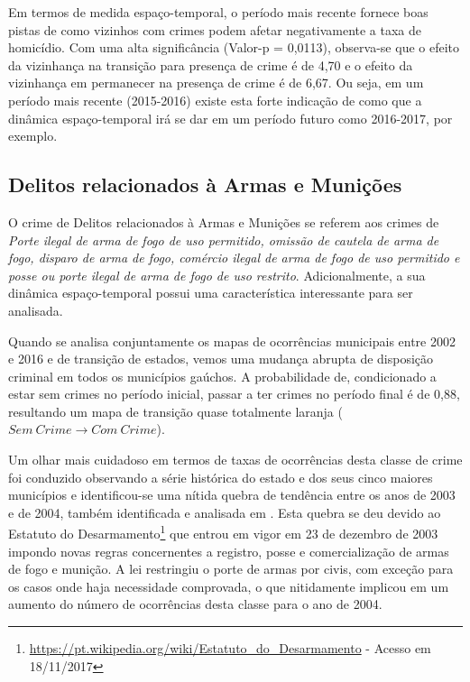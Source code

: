 \documentclass[12pt,openright,oneside,a4paper,english,french,spanish]{abntex2}
\numberwithin{table}{section} %
\numberwithin{figure}{section} %
\newcommand{\co}{\citeonline}
\begin{document}
Em termos de medida espaço-temporal, o período mais recente fornece boas pistas de como vizinhos com crimes podem afetar negativamente a taxa de homicídio. Com uma alta significância (Valor-p = 0,0113), observa-se que o efeito da vizinhança na transição para presença de crime é de 4,70 e o efeito da vizinhança em permanecer na presença de crime é de 6,67. Ou seja, em um período mais recente (2015-2016) existe esta forte indicação de como que a dinâmica espaço-temporal irá se dar em um período futuro como 2016-2017, por exemplo.

\subsection{Delitos relacionados à Armas e Munições\label{sec:armas_acoplamento}}

O crime de Delitos relacionados à Armas e Munições se referem aos crimes de \textit{Porte ilegal de arma de fogo de uso permitido, omissão de cautela de arma de fogo, disparo de arma de fogo, comércio ilegal de arma de fogo de uso permitido e posse ou porte ilegal de arma de fogo de uso restrito}. Adicionalmente, a sua dinâmica espaço-temporal possui uma característica interessante para ser analisada.

Quando se analisa conjuntamente os mapas de ocorrências municipais entre 2002 e 2016 e de transição de estados, vemos uma mudança abrupta de disposição criminal em todos os municípios gaúchos. A probabilidade de, condicionado a estar sem crimes no período inicial, passar a ter crimes no período final é de 0,88, resultando um mapa de transição quase totalmente laranja ($Sem \ Crime \rightarrow Com \ Crime$).

Um olhar mais cuidadoso em termos de taxas de ocorrências desta classe de crime foi conduzido observando a série histórica do estado e dos seus cinco maiores municípios e identificou-se uma nítida quebra de tendência entre os anos de 2003 e de 2004, também identificada e analisada em \co{menezes2017relaccoes}. Esta quebra se deu devido ao Estatuto do Desarmamento\footnote{\url{https://pt.wikipedia.org/wiki/Estatuto_do_Desarmamento} - Acesso em 18/11/2017} que entrou em vigor em 23 de dezembro de 2003 impondo novas regras concernentes a registro, posse e comercialização de armas de fogo e munição. A lei restringiu o porte de armas por civis, com exceção para os casos onde haja necessidade comprovada, o que nitidamente implicou em um aumento do número de ocorrências desta classe para o ano de 2004.
\end{document}
